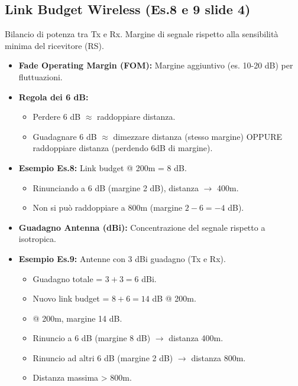 \documentclass{article}
\begin{document}
\subsection{Link Budget Wireless (Es.8 e 9 slide 4)}
Bilancio di potenza tra Tx e Rx. Margine di segnale rispetto alla sensibilità minima del ricevitore (RS).
\begin{itemize}
    \item \textbf{Fade Operating Margin (FOM):} Margine aggiuntivo (es. 10-20 dB) per fluttuazioni.
    \item \textbf{Regola dei 6 dB:}
    \begin{itemize}
        \item Perdere 6 dB $\approx$ raddoppiare distanza.
        \item Guadagnare 6 dB $\approx$ dimezzare distanza (stesso margine) OPPURE raddoppiare distanza (perdendo 6dB di margine).
    \end{itemize}
    \item \textbf{Esempio Es.8:} Link budget @ 200m = 8 dB.
    \begin{itemize}
        \item Rinunciando a 6 dB (margine 2 dB), distanza $\rightarrow$ 400m.
        \item Non si può raddoppiare a 800m (margine $2 - 6 = -4$ dB).
    \end{itemize}
    \item \textbf{Guadagno Antenna (dBi):} Concentrazione del segnale rispetto a isotropica.
    \item \textbf{Esempio Es.9:} Antenne con 3 dBi guadagno (Tx e Rx).
    \begin{itemize}
        \item Guadagno totale = $3 + 3 = 6$ dBi.
        \item Nuovo link budget = $8 + 6 = 14$ dB @ 200m.
        \item @ 200m, margine 14 dB.
        \item Rinuncio a 6 dB (margine 8 dB) $\rightarrow$ distanza 400m.
        \item Rinuncio ad altri 6 dB (margine 2 dB) $\rightarrow$ distanza 800m.
        \item Distanza massima > 800m.
    \end{itemize}
\end{itemize}
\end{document}
